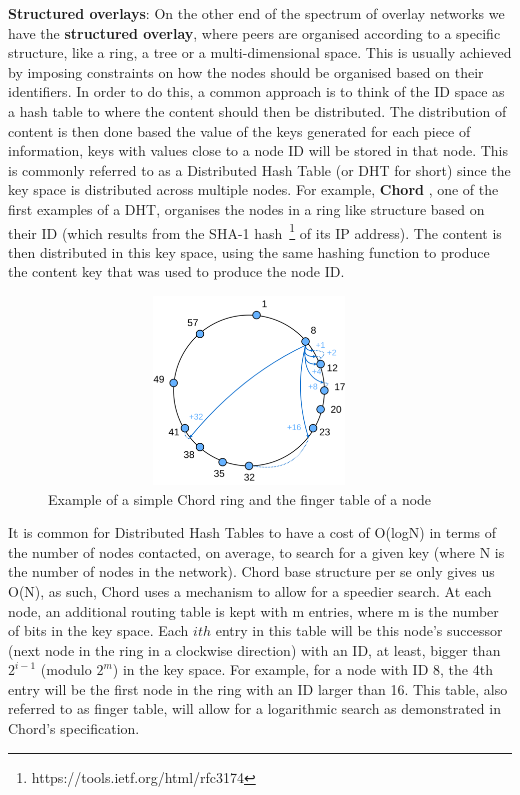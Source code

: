 \textbf{Structured overlays}: On the other end of the spectrum of
overlay networks we have the \textbf{structured overlay}, where peers
are organised according to a specific structure, like a ring, a tree or
a multi-dimensional space. This is usually achieved by imposing
constraints on how the nodes should be organised based on their
identifiers. In order to do this, a common approach is to think of the
ID space as a hash table to where the content should then be
distributed. The distribution of content is then done based the value of
the keys generated for each piece of information, keys with values close
to a node ID will be stored in that node. This is commonly referred to
as a Distributed Hash Table (or DHT for short) since the key space is
distributed across multiple nodes. For example, \textbf{Chord} \cite{Stoica2001},
one of the first examples of a DHT, organises the nodes in a ring like structure
based on their ID (which results from the SHA-1 hash~\footnote{https://tools.ietf.org/html/rfc3174}
of its IP address). The content is then distributed in this key space, using the same hashing function to
produce the content key that was used to produce the node ID.

\begin{figure}[hb!]
  \centering
  \includegraphics[max height=5cm,max width=0.95\textwidth]{img/chord.png}
  \caption{Example of a simple Chord ring and the finger table of a node}
  \label{fig:chord}
\end{figure}

It is common for Distributed Hash Tables to have a cost of O(log{}N)
in terms of the number of nodes
contacted, on average, to search for a given key (where N is the number
of nodes in the network). Chord base structure per se only gives us
O(N), as such, Chord uses a mechanism to allow for a speedier search. At
each node, an additional routing table is kept with m entries, where m
is the number of bits in the key space. Each $ith$ entry in this table
will be this node's successor (next node in the ring in a clockwise
direction) with an ID, at least, bigger than $2^{i-1}$ (modulo $2^{m}$)
in the key space. For example, for
a node with ID 8, the 4th entry will be the first node in the ring with
an ID larger than 16. This table, also referred to as finger table, will
allow for a logarithmic search as demonstrated in Chord's specification.

